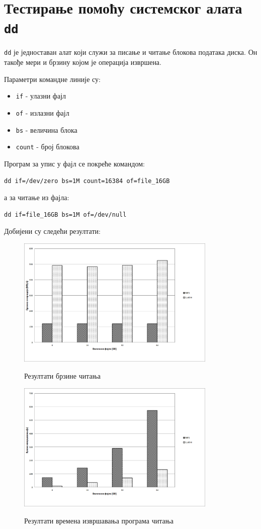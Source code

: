\section{Тестирање помоћу системског алата \texttt{dd} }

\texttt{dd} је једноставан алат који служи за писање и читање блокова података диска. Он такође мери и брзину којом је операција извршена.

Параметри командне линије су:

\begin{itemize}
\item \texttt{if} - улазни фајл
\item \texttt{of} - излазни фајл
\item \texttt{bs} - величина блока
\item \texttt{count} - број блокова
\end{itemize}
Програм за упис у фајл  се покреће командом:
\begin{verbatim}
dd if=/dev/zero bs=1M count=16384 of=file_16GB
\end{verbatim}
а за читање из фајла:
\begin{verbatim}
dd if=file_16GB bs=1M of=/dev/null
\end{verbatim}
Добијени су следећи резултати:
\begin{figure}[H]
   \centering
       \includegraphics[width=0.85\textwidth]{slike/results/dd_read_speed.png}\\[1cm]
   \caption{Резултати брзине читања}
\end{figure} 
\begin{figure}[H]
    \centering
        \includegraphics[width=0.85\textwidth]{slike/results/dd_read_time.png}\\[1cm]
    \caption{Резултати времена извршавања програма читања}
\end{figure}  
